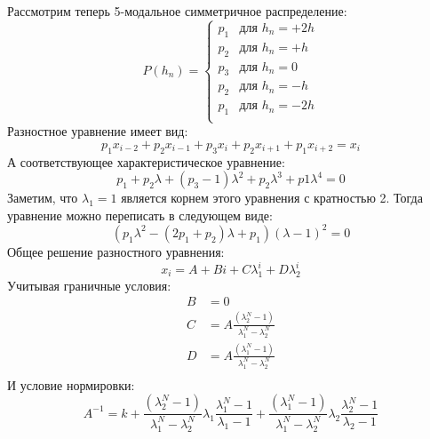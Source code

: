 Рассмотрим теперь 5-модальное симметричное распределение:
\begin{equation*}
P(h_n) =
\begin{cases}
	p_1 &\mbox{для } h_n= +2h \\
	p_2 &\mbox{для } h_n= +h \\
	p_3 &\mbox{для } h_n= 0\\
	p_2 &\mbox{для } h_n = -h\\
	p_1&\mbox{для } h_n = -2h\\
\end{cases}
\end{equation*}
Разностное уравнение имеет вид:
\begin{equation*}
p_1 x_{i-2} + p_2 x_{i-1} + p_3 x_i + p_2 x_{i+1} + p_1 x_{i+2} = x_i
\end{equation*}
А соответствующее характеристическое уравнение:
\begin{equation*}
p_1 + p_2 \lambda + (p_3-1) \lambda^2 + p_2 \lambda^3 + p1 \lambda^4 = 0
\end{equation*}
Заметим, что $\lambda_1=1$ является корнем этого уравнения с кратностью 2. Тогда уравнение можно переписать в следующем виде:
\begin{equation*}
(p_1\lambda^2 - (2p_1+p_2) \lambda + p_1) (\lambda - 1)^2 =0
\end{equation*}
Общее решение разностного уравнения:
\begin{equation*}
x_i = A + B i + C \lambda_1^i + D \lambda_2^i
\end{equation*}
Учитывая граничные условия:
\begin{align*}
B&=0 \\
C&=A \frac{\left(\lambda_2^N-1\right)}{\lambda_1^N-\lambda_2^N} \\
D&=A\frac{\left(\lambda_1^N-1\right)}{\lambda_1^N-\lambda_2^N} \\
\end{align*}
И  условие нормировки:
\begin{equation*}
	A^{-1} = k+\frac{\left(\lambda_2^N-1\right)}{\lambda_1^N-\lambda_2^N}\lambda_1 \frac{\lambda_1^N-1}{\lambda_1-1}+\frac{\left(\lambda_1^N-1\right)}{\lambda_1^N-\lambda_2^N}\lambda_2 \frac{\lambda_2^N-1}{\lambda_2-1}
\end{equation*}

 

